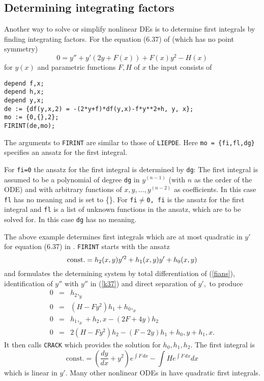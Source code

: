 \subsection{Determining integrating factors}
Another way to solve or simplify nonlinear DEs is to determine first
integrals by finding integrating factors. For the equation (6.37) of
\cite{Ka} (which has no point symmetry)
\begin{equation}
0 = y'' + y'(2y + F(x)) + F(x)y^2 - H(x)  \label{k37}
\end{equation}
for $y(x)$ and parametric functions $F, H$ of $x$ the input
consists of
\begin{verbatim}
depend f,x;
depend h,x;
depend y,x;
de := {df(y,x,2) = -(2*y+f)*df(y,x)-f*y**2+h, y, x};
mo := {0,{},2};
FIRINT(de,mo);
\end{verbatim}
The arguments to {\tt FIRINT} are similar to those of {\tt LIEPDE}\@.
Here {\tt mo = \{fi,fl,dg\}} specifies an ansatz for the first integral.

   For {\tt fi=0} the ansatz for the first integral is determined by
{\tt dg}: The first integral is assumed to be a
polynomial of degree {\tt dg} in $y^{(n-1)}$ (with $n$ as the order of the ODE)
and with arbitrary functions of $x, y,\ldots,y^{(n-2)}$ as coefficients.
In this case
{\tt fl} has no meaning and is set to \{\}.
For {\tt fi}$\neq${\tt 0, fi} is the ansatz for the first integral and
{\tt fl} is a list of
unknown functions in the ansatz, which are to be solved for. In this case
{\tt dg} has no meaning.

   The above example determines first integrals which are at most quadratic
in $y'$ for equation (6.37) in \cite{Ka}.
{\tt FIRINT} starts with the ansatz
\begin{equation}
{\rm const.} = h_2(x,y)y'^2 + h_1(x,y)y' + h_0(x,y)  \label{fians}
\end{equation}
and formulates the determining system by total differentiation of
(\ref{fians}), identification of $y''$ with $y''$ in (\ref{k37}) and
direct separation of $y',$ to produce
\begin{eqnarray*}
0 & = & h_2,_y  \\
0 & = & (H - F y^2)h_1 + h_0,_x  \\
0 & = & h_1,_x + h_2,x - (2F + 4y)h_2  \\
0 & = & 2(H - Fy^2)h_2 - (F - 2y)h_1 + h_0,y + h_1,x.
\end{eqnarray*}
It then calls {\tt CRACK} which provides the solution for $h_0,h_1,h_2.$
The first integral is
\begin{equation}
\mbox{const.} = \left( \frac{dy}{dx}+y^2 \right) e^{\int \!F\,dx} -
\int He^{\int \!F\,dx} dx
\end{equation}
which is linear in $y'$. Many other nonlinear ODEs in \cite{Ka} have quadratic
first integrals.

